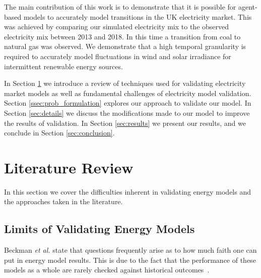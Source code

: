 The main contribution of this work is to demonstrate that it is possible for agent-based models to accurately model transitions in the UK electricity market. This was achieved by comparing our simulated electricity mix to the observed electricity mix between 2013 and 2018. In this time a transition from coal to natural gas was observed. We demonstrate that a high temporal granularity is required to accurately model fluctuations in wind and solar irradiance for intermittent renewable energy sources.


In Section \ref{lit-review} we introduce a review of techniques used for validating electricity market models as well as fundamental challenges of electricity model validation. Section \ref{ssec:prob_formulation} explores our approach to validate our model. In Section \ref{sec:details} we discuss the modifications made to our model to improve the results of validation. In Section \ref{sec:results} we present our results, and we conclude in Section \ref{sec:conclusion}.

\section{Literature Review}
\label{lit-review}



In this section we cover the difficulties inherent in validating energy models and the approaches taken in the literature.

\subsection{Limits of Validating Energy Models}

Beckman \textit{et al.} state that questions frequently arise as to how much faith one can put in energy model results. This is due to the fact that the performance of these models as a whole are rarely checked against historical outcomes~\cite{Beckman2011}.


